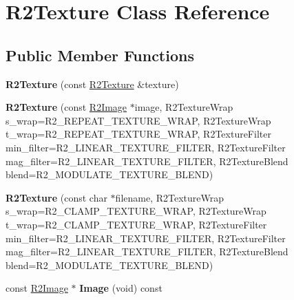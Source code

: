 \hypertarget{class_r2_texture}{}\section{R2\+Texture Class Reference}
\label{class_r2_texture}
\subsection*{Public Member Functions}
\begin{DoxyCompactItemize}
\item 
{\bfseries R2\+Texture} (const \hyperlink{class_r2_texture}{R2\+Texture} \&texture)\hypertarget{class_r2_texture_aa0d837b618bacd079b5f017106290de3}{}\label{class_r2_texture_aa0d837b618bacd079b5f017106290de3}

\item 
{\bfseries R2\+Texture} (const \hyperlink{class_r2_image}{R2\+Image} $\ast$image, R2\+Texture\+Wrap s\+\_\+wrap=R2\+\_\+\+R\+E\+P\+E\+A\+T\+\_\+\+T\+E\+X\+T\+U\+R\+E\+\_\+\+W\+R\+AP, R2\+Texture\+Wrap t\+\_\+wrap=R2\+\_\+\+R\+E\+P\+E\+A\+T\+\_\+\+T\+E\+X\+T\+U\+R\+E\+\_\+\+W\+R\+AP, R2\+Texture\+Filter min\+\_\+filter=R2\+\_\+\+L\+I\+N\+E\+A\+R\+\_\+\+T\+E\+X\+T\+U\+R\+E\+\_\+\+F\+I\+L\+T\+ER, R2\+Texture\+Filter mag\+\_\+filter=R2\+\_\+\+L\+I\+N\+E\+A\+R\+\_\+\+T\+E\+X\+T\+U\+R\+E\+\_\+\+F\+I\+L\+T\+ER, R2\+Texture\+Blend blend=R2\+\_\+\+M\+O\+D\+U\+L\+A\+T\+E\+\_\+\+T\+E\+X\+T\+U\+R\+E\+\_\+\+B\+L\+E\+ND)\hypertarget{class_r2_texture_a8407f16675357b4e01d1581615286399}{}\label{class_r2_texture_a8407f16675357b4e01d1581615286399}

\item 
{\bfseries R2\+Texture} (const char $\ast$filename, R2\+Texture\+Wrap s\+\_\+wrap=R2\+\_\+\+C\+L\+A\+M\+P\+\_\+\+T\+E\+X\+T\+U\+R\+E\+\_\+\+W\+R\+AP, R2\+Texture\+Wrap t\+\_\+wrap=R2\+\_\+\+C\+L\+A\+M\+P\+\_\+\+T\+E\+X\+T\+U\+R\+E\+\_\+\+W\+R\+AP, R2\+Texture\+Filter min\+\_\+filter=R2\+\_\+\+L\+I\+N\+E\+A\+R\+\_\+\+T\+E\+X\+T\+U\+R\+E\+\_\+\+F\+I\+L\+T\+ER, R2\+Texture\+Filter mag\+\_\+filter=R2\+\_\+\+L\+I\+N\+E\+A\+R\+\_\+\+T\+E\+X\+T\+U\+R\+E\+\_\+\+F\+I\+L\+T\+ER, R2\+Texture\+Blend blend=R2\+\_\+\+M\+O\+D\+U\+L\+A\+T\+E\+\_\+\+T\+E\+X\+T\+U\+R\+E\+\_\+\+B\+L\+E\+ND)\hypertarget{class_r2_texture_a970f811d9fb50a87158c26ae08f268c5}{}\label{class_r2_texture_a970f811d9fb50a87158c26ae08f268c5}

\item 
const \hyperlink{class_r2_image}{R2\+Image} $\ast$ {\bfseries Image} (void) const \hypertarget{class_r2_texture_a1436a86c2b43b1ee864f81f6ab7d203b}{}\label{class_r2_texture_a1436a86c2b43b1ee864f81f6ab7d203b}


\end{DoxyCompactItemize}
